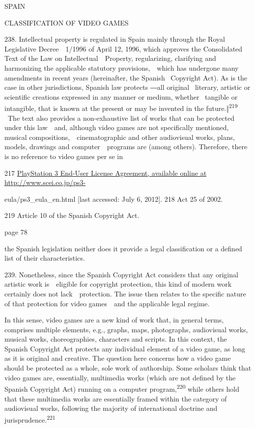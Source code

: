 \documentclass[
]{article}
\begin{document}
{SPAIN}

{CLASSIFICATION OF VIDEO GAMES}

{238. }{Intellectual property is regulated in Spain mainly through the
}{Royal Legislative Decree~~1/1996 }{of April 12, 1996, which approves
the }{Consolidated Text of the Law on Intellectual~~Property}{,
regularizing, clarifying and harmonizing the applicable statutory
provisions,~~which has undergone many amendments in recent years
(hereinafter, the Spanish }{~Copyright Act}{). As is the case in other
jurisdictions, Spanish law protects }{―all original }{~literary,
artistic or scientific creations expressed in any manner or medium,
whether }{~tangible or intangible, that is known at the present or may
be invented in the future.‖}\textsuperscript{{219 }}{~The text also
provides a non-exhaustive list of works that can be protected under this
law~~and, although video games are not specifically mentioned, musical
compositions,~~cinematographic and other audiovisual works, plans,
models, drawings and computer~~programs are (among others). Therefore,
there is no reference to video games }{per se }{in}

{217 }\href{http://www.scei.co.jp/ps3-}{{PlayStation 3 End-User License
Agreement, available online at http://www.scei.co.jp/ps3-}}

{eula/ps3\_eula\_en.html {[}last accessed: July 6, 2012{]}. }{218 }{Act
25 of 2002.}

{219 }{Article 10 of the Spanish }{Copyright Act}{.}

{page 78}

{the Spanish legislation neither does it provide a legal classification
or a defined list of their characteristics.}

{239. }{Nonetheless, since the Spanish }{Copyright Act }{considers that
any original artistic work is~~eligible for copyright protection, this
kind of modern work certainly does not lack~~protection. The issue then
relates to the specific nature of that protection for video games~~and
the applicable legal regime.}

{In this sense, video games are a new kind of work that, in general
terms, comprises multiple elements, e.g., graphs, maps, photographs,
audiovisual works, musical works, choreographies, characters and
scripts. In this context, the Spanish }{Copyright Act }{protects any
individual element of a video game, as long as it is original and
creative. The question here concerns how a video game should be
protected as a whole, sole work of authorship. Some scholars think that
video games are, essentially, }{multimedia works }{(which are not
defined by the Spanish }{Copyright Act}{) running on a computer
program,}\textsuperscript{{220 }}{while others hold that these
multimedia works are essentially framed within the category of
audiovisual works, following the majority of international doctrine and
jurisprudence.}\textsuperscript{{221}}
\end{document}
